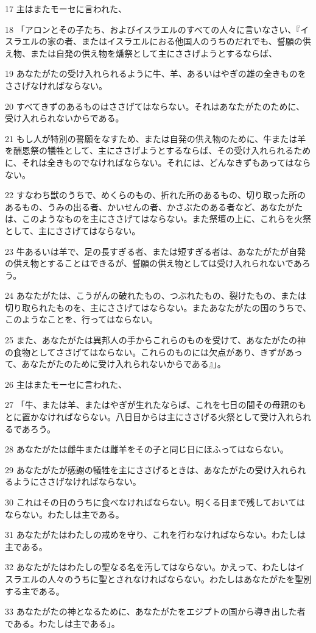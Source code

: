 \par 17 主はまたモーセに言われた、
\par 18 「アロンとその子たち、およびイスラエルのすべての人々に言いなさい、『イスラエルの家の者、またはイスラエルにおる他国人のうちのだれでも、誓願の供え物、または自発の供え物を燔祭として主にささげようとするならば、
\par 19 あなたがたの受け入れられるように牛、羊、あるいはやぎの雄の全きものをささげなければならない。
\par 20 すべてきずのあるものはささげてはならない。それはあなたがたのために、受け入れられないからである。
\par 21 もし人が特別の誓願をなすため、または自発の供え物のために、牛または羊を酬恩祭の犠牲として、主にささげようとするならば、その受け入れられるために、それは全きものでなければならない。それには、どんなきずもあってはならない。
\par 22 すなわち獣のうちで、めくらのもの、折れた所のあるもの、切り取った所のあるもの、うみの出る者、かいせんの者、かさぶたのある者など、あなたがたは、このようなものを主にささげてはならない。また祭壇の上に、これらを火祭として、主にささげてはならない。
\par 23 牛あるいは羊で、足の長すぎる者、または短すぎる者は、あなたがたが自発の供え物とすることはできるが、誓願の供え物としては受け入れられないであろう。
\par 24 あなたがたは、こうがんの破れたもの、つぶれたもの、裂けたもの、または切り取られたものを、主にささげてはならない。またあなたがたの国のうちで、このようなことを、行ってはならない。
\par 25 また、あなたがたは異邦人の手からこれらのものを受けて、あなたがたの神の食物としてささげてはならない。これらのものには欠点があり、きずがあって、あなたがたのために受け入れられないからである』」。
\par 26 主はまたモーセに言われた、
\par 27 「牛、または羊、またはやぎが生れたならば、これを七日の間その母親のもとに置かなければならない。八日目からは主にささげる火祭として受け入れられるであろう。
\par 28 あなたがたは雌牛または雌羊をその子と同じ日にほふってはならない。
\par 29 あなたがたが感謝の犠牲を主にささげるときは、あなたがたの受け入れられるようにささげなければならない。
\par 30 これはその日のうちに食べなければならない。明くる日まで残しておいてはならない。わたしは主である。
\par 31 あなたがたはわたしの戒めを守り、これを行わなければならない。わたしは主である。
\par 32 あなたがたはわたしの聖なる名を汚してはならない。かえって、わたしはイスラエルの人々のうちに聖とされなければならない。わたしはあなたがたを聖別する主である。
\par 33 あなたがたの神となるために、あなたがたをエジプトの国から導き出した者である。わたしは主である」。

